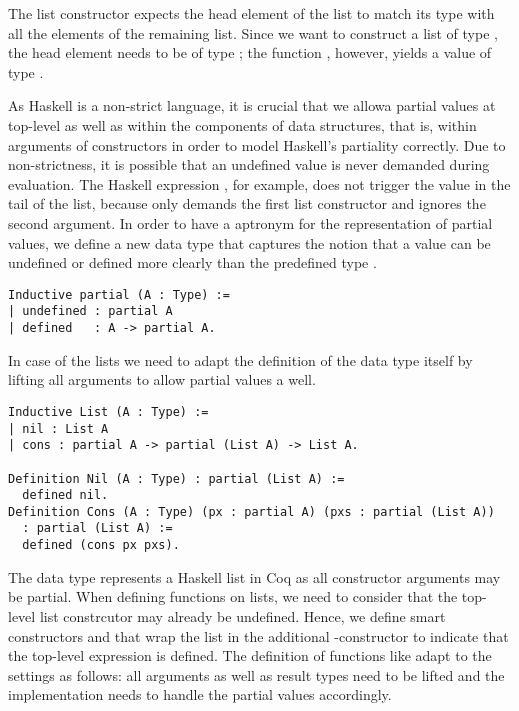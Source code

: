 The list constructor  expects the head element of the list to match its type with all the elements of the remaining list.
Since we want to construct a list of type , the head element needs to be of type ; the function , however, yields a value of type .

As Haskell is a non-strict language, it is crucial that we allowa partial values at top-level as well as within the components of data structures, that is, within arguments of constructors in order to model Haskell's partiality correctly.
Due to non-strictness, it is possible that an undefined value is never demanded during evaluation.
The Haskell expression , for example, does not trigger the  value in the tail of the list, because  only demands the first list constructor \hinl{:} and ignores the second argument.
In order to have a aptronym for the representation of partial values, we define a new data type  that captures the notion that a value can be undefined or defined more clearly than the predefined type .

\begin{verbatim}
Inductive partial (A : Type) :=
| undefined : partial A
| defined   : A -> partial A.
\end{verbatim}

In case of the lists we need to adapt the definition of the data type itself by lifting all arguments to allow partial values a well.

\begin{verbatim}
Inductive List (A : Type) :=
| nil : List A
| cons : partial A -> partial (List A) -> List A.

Definition Nil (A : Type) : partial (List A) :=
  defined nil.
Definition Cons (A : Type) (px : partial A) (pxs : partial (List A)) 
  : partial (List A) :=
  defined (cons px pxs).
\end{verbatim}

The data type  represents a Haskell list in Coq as all constructor arguments may be partial.
When defining functions on lists, we need to consider that the top-level list constrcutor may already be undefined.
Hence, we define smart constructors  and  that wrap the list in the additional -constructor to indicate that the top-level expression is defined.
The definition of  functions like  adapt to the settings as follows: all arguments as well as result types need to be lifted and the implementation needs to handle the partial values accordingly.

